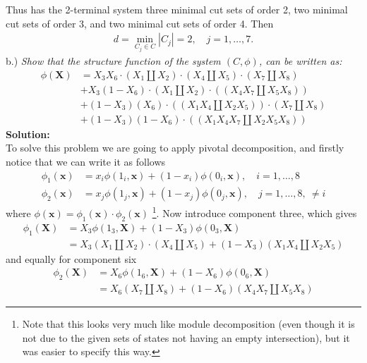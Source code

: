 \documentclass[12pt,
               a4paper,
               article,
               oneside,
               english,oldfontcommands]{memoir}
\newcommand{\spaze}{\vspace{4mm}\\}
\begin{document}
Thus has the 2-terminal system three minimal cut sets of order 2, two minimal cut sets of order 3, and two minimal cut sets of order 4. Then 
\begin{align*}
d = \min_{C_{j} \in C} |C_{j}|= 2, \quad j = 1, \ldots, 7.
\end{align*}
b.) \emph{Show that the structure function of the system $(C,\phi)$,  can be written as:}
\begin{align*}
\phi(\bm{X}) &= X_3 X_6 \cdot \left( X_1 \coprod X_2 \right) \cdot \left(X_4 \coprod X_5 \right)\cdot \left(X_7 \coprod X_8 \right) \\[5pt]
&+ X_3 (1- X_6) \cdot \left( X_1 \coprod X_2 \right) \cdot \left( \left( X_4 X_7 \coprod X_5 X_8 \right) \right) \\[5pt]
&+ (1 - X_3 )(X_6) \cdot \left( \left(X_1X_4 \coprod X_2 X_5 \right) \right) \cdot \left( X_7 \coprod X_8 \right) \\[5pt]
&+ (1 - X_3 )(1 - X_6) \cdot \left( \left(X_1X_4X_7 \coprod X_2 X_5 X_8 \right) \right)
\end{align*}
\textbf{Solution:} \spaze
To solve this problem we are going to apply pivotal decomposition, and firstly notice that we can write it as follows
\begin{align}
\phi_{1}(\bm{x}) &= x_{i} \phi(1_i, \bm{x}) + (1 - x_{i}) \phi(0_{i}, \bm{x}), \quad i = 1, \ldots, 8 \\[5pt]
\phi_{2}(\bm{x}) &= x_{j} \phi(1_{j}, \bm{x}) + (1 - x_{j}) \phi(0_{j}, \bm{x}), \quad j  = 1, \ldots, 8, \ \neq i
\end{align}
where $\phi(\bm{x})= \phi_{1}(\bm{x}) \cdot \phi_{2}(\bm{x})$ \footnote{Note that this looks very much like module decomposition (even though it is not due to the given sets of states not having an empty intersection), but it was easier to  specify this way.}. Now introduce component three, which gives 
\begin{align*}
\phi_{1}(\bm{X}) &= X_{3} \phi(1_3,  \bm{X}) + (1 - X_3) \phi(0_{3}, \bm{X}) \\[5pt]
&= X_3 \left( X_1 \coprod X_2 \right) \cdot \left(X_4 \coprod X_5 \right) + (1 - X_3)\left(X_1X_4 \coprod X_2 X_5 \right)
\end{align*}
and equally for component six 
\begin{align*}
\phi_{2}(\bm{X}) &= X_{6} \phi(1_6,  \bm{X}) + (1 - X_6) \phi(0_{6}, \bm{X}) \\[5pt]
&= X_6 \left( X_7 \coprod X_8 \right)  + (1 - X_6)\left(X_4X_7 \coprod X_5 X_8 \right)
\end{align*}
\end{document}

